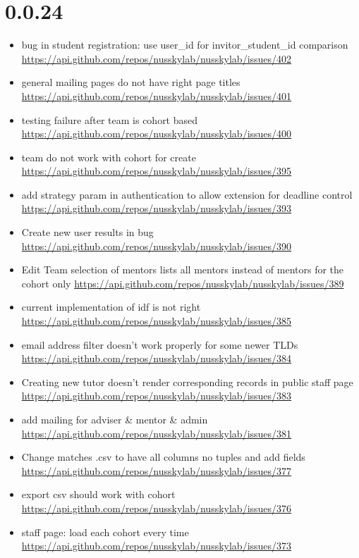 {\section{0.0.24}
\begin{itemize}[noitemsep]
    \item bug in student registration: use user\_id for invitor\_student\_id comparison \url{https://api.github.com/repos/nusskylab/nusskylab/issues/402} 
    \item general mailing pages do not have right page titles \url{https://api.github.com/repos/nusskylab/nusskylab/issues/401} 
    \item testing failure after team is cohort based \url{https://api.github.com/repos/nusskylab/nusskylab/issues/400} 
    \item team do not work with cohort for create \url{https://api.github.com/repos/nusskylab/nusskylab/issues/395} 
    \item add strategy param in authentication to allow extension for deadline control \url{https://api.github.com/repos/nusskylab/nusskylab/issues/393} 
    \item Create new user results in bug \url{https://api.github.com/repos/nusskylab/nusskylab/issues/390} 
    \item Edit Team selection of mentors lists all mentors instead of mentors for the cohort only \url{https://api.github.com/repos/nusskylab/nusskylab/issues/389} 
    \item current implementation of idf is not right \url{https://api.github.com/repos/nusskylab/nusskylab/issues/385} 
    \item email address filter doesn't work properly for some newer TLDs \url{https://api.github.com/repos/nusskylab/nusskylab/issues/384} 
    \item Creating new tutor doesn't render corresponding records in public staff page \url{https://api.github.com/repos/nusskylab/nusskylab/issues/383} 
    \item add mailing for adviser \& mentor \& admin \url{https://api.github.com/repos/nusskylab/nusskylab/issues/381} 
    \item Change matches .csv to have all columns no tuples and add fields \url{https://api.github.com/repos/nusskylab/nusskylab/issues/377} 
    \item export csv should work with cohort \url{https://api.github.com/repos/nusskylab/nusskylab/issues/376} 
    \item staff page: load each cohort every time \url{https://api.github.com/repos/nusskylab/nusskylab/issues/373} 

\end{itemize}}
